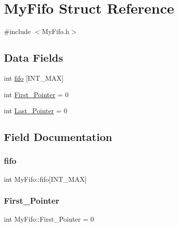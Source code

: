 \hypertarget{structMyFifo}{}\section{My\+Fifo Struct Reference}
\label{structMyFifo}


{\ttfamily \#include $<$My\+Fifo.\+h$>$}

\subsection*{Data Fields}
\begin{DoxyCompactItemize}
\item 
int \hyperlink{structMyFifo_aa768e4f00da0a3d4e018b463a09d30dc}{fifo} \mbox{[}I\+N\+T\+\_\+\+M\+AX\mbox{]}
\item 
int \hyperlink{structMyFifo_a4d426f152ed91f03ad1601cfd7da35b0}{First\+\_\+\+Pointer} = 0
\item 
int \hyperlink{structMyFifo_a1d2edc0e076e119a693819a4a35ce46d}{Last\+\_\+\+Pointer} = 0
\end{DoxyCompactItemize}


\subsection{Field Documentation}
\mbox{\label{structMyFifo_aa768e4f00da0a3d4e018b463a09d30dc}} 
\subsubsection{\texorpdfstring{fifo}{fifo}}
{\footnotesize\ttfamily int My\+Fifo\+::fifo\mbox{[}I\+N\+T\+\_\+\+M\+AX\mbox{]}}

\mbox{\label{structMyFifo_a4d426f152ed91f03ad1601cfd7da35b0}} 
\subsubsection{\texorpdfstring{First\+\_\+\+Pointer}{First\_Pointer}}
{\footnotesize\ttfamily int My\+Fifo\+::\+First\+\_\+\+Pointer = 0}

\mbox{\label{structMyFifo_a1d2edc0e076e119a693819a4a35ce46d}} 
